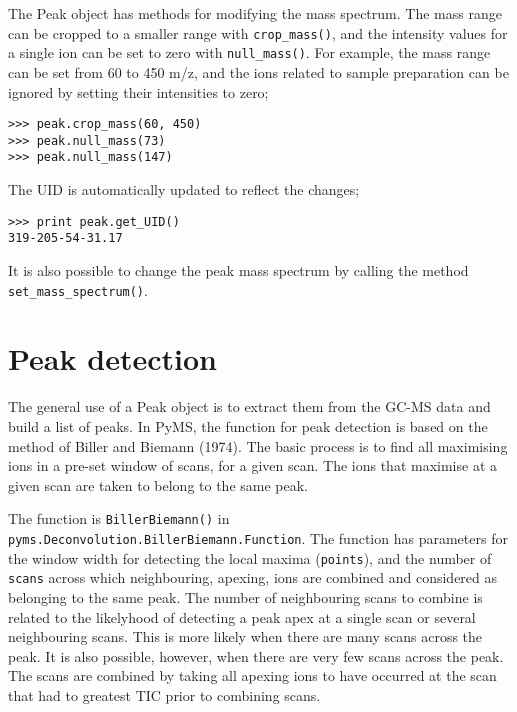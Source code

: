 
The Peak object has methods for modifying the mass spectrum. The mass range can
be cropped to a smaller range with {\tt crop\_mass()}, and the intensity
values for a single ion can be set to zero with {\tt null\_mass()}. For
example, the mass range can be set from 60 to 450 m/z, and the ions related to
sample preparation can be ignored by setting their intensities to zero;

\begin{verbatim}
>>> peak.crop_mass(60, 450)
>>> peak.null_mass(73)
>>> peak.null_mass(147)
\end{verbatim}

\noindent
The UID is automatically updated to reflect the changes;

\begin{verbatim}
>>> print peak.get_UID()
319-205-54-31.17
\end{verbatim}

It is also possible to change the peak mass spectrum by calling the
method {\tt set\_mass\_spectrum()}.

\section{Peak detection}
\label{sec:peak-detection}

The general use of a Peak object is to extract them from the GC-MS data and
build a list of peaks. In PyMS, the function for peak detection is based on the
method of Biller and Biemann (1974)\cite{biller74}. The basic process is to find
all maximising ions in a pre-set window of scans, for a given scan.  The ions
that maximise at a given scan are taken to belong to the same peak.

The function is {\tt BillerBiemann()} in
{\tt pyms.Deconvolution.BillerBiemann.Function}. The function has parameters for
the window width for detecting the local maxima ({\tt points}), and the number
of {\tt scans} across which neighbouring, apexing, ions are combined and
considered as belonging to the same peak. The number of neighbouring scans to
combine is related to the likelyhood of detecting a peak apex at a single scan
or several neighbouring scans. This is more likely when there are many scans
across the peak. It is also possible, however, when there are very few scans
across the peak. The scans are combined by taking all apexing ions to have
occurred at the scan that had to greatest TIC prior to combining scans.

